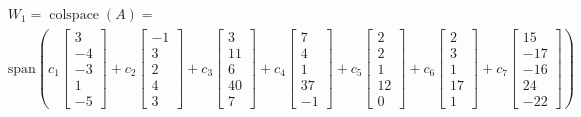 \documentclass{article}
\DeclareMathOperator{\colspace}{colspace}
\begin{document}
\begin{align*}
	& W_1 = \colspace(A) = \\
	& \text{span} \left(
		c_1 \begin{bmatrix} 3 \\ -4 \\ -3 \\ 1 \\ -5 \end{bmatrix}
		+ c_2 \begin{bmatrix} -1 \\ 3 \\ 2 \\ 4 \\ 3 \end{bmatrix}
		+ c_3 \begin{bmatrix} 3 \\ 11 \\ 6 \\ 40 \\ 7 \end{bmatrix}
		+ c_4 \begin{bmatrix} 7 \\ 4 \\ 1 \\ 37 \\ -1 \end{bmatrix}
		+ c_5 \begin{bmatrix} 2 \\ 2 \\ 1 \\ 12 \\ 0 \end{bmatrix}
		+ c_6 \begin{bmatrix} 2 \\ 3 \\ 1 \\ 17 \\ 1 \end{bmatrix}
		+ c_7 \begin{bmatrix} 15 \\ -17 \\ -16 \\ 24 \\ -22 \end{bmatrix}
	\right)
\end{align*}
\end{document}
